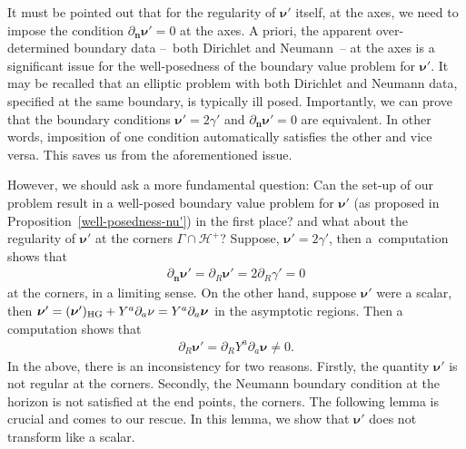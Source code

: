 \documentclass[11pt]{article}
\numberwithin{equation}{section}
\def\ptl{\partial}%
\def\mbo#1{\boldsymbol{#1}}%
\numberwithin{equation}{section}
\begin{document}
It must be pointed out that for the regularity of $\mbo{\nu'}$ itself, at the axes, we need to impose the condition $\ptl_{\mbo{n}} \mbo{\nu}'=0$ at the axes. A priori, the apparent over-determined boundary data --~both Dirichlet and Neumann~-- at the axes is a significant issue for the well-posedness of the boundary value problem for $\mbo{\nu}'$. It may be recalled that an elliptic problem with both Dirichlet and Neumann data, specified at the same boundary, is typically ill posed. Importantly, we can prove that the boundary conditions $\mbo{\nu}' = 2 \gamma'$ and $\ptl_{\mbo{n}} \mbo{\nu}'=0$ are equivalent. In other words, imposition of one condition automatically satisfies the other and vice versa. This saves us from the aforementioned issue.

However, we should ask a more fundamental question: Can the set-up of our problem result in a well-posed boundary value problem for $\mbo{\nu}'$ (as proposed in Proposition~\ref{well-posedness-nu'}) in the first place? and what about the regularity of $\mbo{\nu}'$ at the corners $\Gamma \cap \mathcal{H}^+$?
Suppose, $\mbo{\nu}' = 2 \gamma'$, then a~computation shows that
\begin{align*}
\ptl_{\mbo{n}} \mbo{\nu}' = \ptl_R \mbo{\nu}'= 2 \ptl_R \gamma' =0
\end{align*}
at the corners, in a limiting sense. On the other hand, suppose $\mbo{\nu}'$ were a scalar, then $\mbo{\nu}' = (\mbo{\nu}')_{{\rm HG}} + Y^a \ptl_a \nu = Y^a \ptl_a \mbo{\nu}$ in the asymptotic regions. Then a computation shows that
\begin{align*}
\ptl_R \mbo{\nu}' = \ptl_R Y^a \ptl_a \mbo{\nu} \neq 0.
\end{align*}
In the above, there is an inconsistency for two reasons. Firstly, the quantity $\mbo{\nu}'$ is not regular at the corners. Secondly, the Neumann boundary condition at the horizon is not satisfied at the end points, the corners. The following lemma is crucial and comes to our rescue. In this lemma, we show that $\mbo{\nu}'$ does not transform like a scalar.
\end{document}
